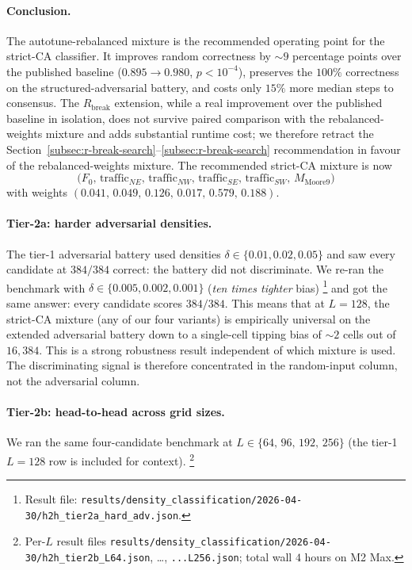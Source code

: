 \documentclass[11pt,a4paper]{article}
\newcommand{\fpath}[1]{\nolinkurl{#1}}
\begin{document}
\paragraph{Conclusion.}
The autotune-rebalanced mixture is the recommended operating point
for the strict-CA classifier.  It improves random correctness by
\({\sim}\!9\) percentage points over the published baseline
(\(0.895 \to 0.980\), \(p < 10^{-4}\)), preserves the
\(100\%\) correctness on the structured-adversarial battery, and
costs only \(15\%\) more median steps to consensus.  The
\(R_{\mathrm{break}}\) extension, while a real improvement over the
published baseline in isolation, does not survive paired comparison
with the rebalanced-weights mixture and adds substantial runtime
cost; we therefore retract the
Section~\ref{subsec:r-break-search}--\ref{subsec:r-break-search}
recommendation in favour of the rebalanced-weights mixture.
The recommended strict-CA mixture is now
\[
\bigl(F_0,\,\mathrm{traffic}_{NE},\,\mathrm{traffic}_{NW},\,
       \mathrm{traffic}_{SE},\,\mathrm{traffic}_{SW},\,M_{\mathrm{Moore9}}\bigr)
\]
with weights \((0.041,\,0.049,\,0.126,\,0.017,\,0.579,\,0.188)\).

\paragraph{Tier-2a: harder adversarial densities.}
The tier-1 adversarial battery used densities
\(\delta \in \{0.01, 0.02, 0.05\}\) and saw every candidate at
\(384/384\) correct: the battery did not discriminate.  We re-ran the
benchmark with \(\delta \in \{0.005, 0.002, 0.001\}\) (\emph{ten times
tighter} bias)
\footnote{Result file:
\fpath{results/density_classification/2026-04-30/h2h_tier2a_hard_adv.json}.}
and got the same answer: every candidate scores
\(384/384\).  This means that at \(L=128\), the strict-CA mixture
(any of our four variants) is empirically universal on the extended
adversarial battery down to a single-cell tipping bias of
\({\sim}\!2\) cells out of \(16{,}384\).  This is a strong robustness
result independent of which mixture is used.  The discriminating
signal is therefore concentrated in the random-input column, not the
adversarial column.

\paragraph{Tier-2b: head-to-head across grid sizes.}
We ran the same four-candidate benchmark at
\(L \in \{64,\,96,\,192,\,256\}\) (the tier-1 \(L=128\) row is
included for context).
\footnote{Per-\(L\) result files
\fpath{results/density_classification/2026-04-30/h2h_tier2b_L64.json},
\dots, \fpath{...L256.json};
total wall \(4\) hours on M2 Max.}
\end{document}
